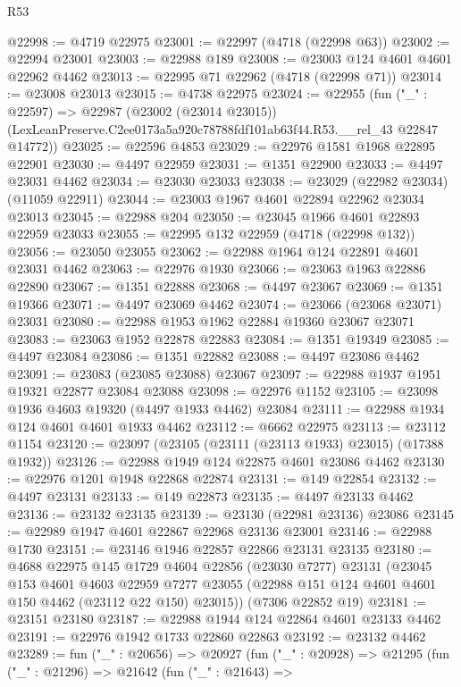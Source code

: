 \begin{lexlean}{R53}
\begin{coremodule}
@22998 := @4719 @22975
@23001 := @22997 (@4718 (@22998 @63))
@23002 := @22994 @23001
@23003 := @22988 @189
@23008 := @23003 @124 @4601 @4601 @22962 @4462
@23013 := @22995 @71 @22962 (@4718 (@22998 @71))
@23014 := @23008 @23013
@23015 := @4738 @22975
@23024 := @22955
    (fun ("_" : @22597) =>
    @22987
      (@23002 (@23014 @23015))
      (LexLeanPreserve.C2ee0173a5a920c78788fdf101ab63f44.R53.__rel_43 @22847 @14772))
@23025 := @22596 @4853
@23029 := @22976 @1581 @1968 @22895 @22901
@23030 := @4497 @22959
@23031 := @1351 @22900
@23033 := @4497 @23031 @4462
@23034 := @23030 @23033
@23038 := @23029 (@22982 @23034) (@11059 @22911)
@23044 := @23003 @1967 @4601 @22894 @22962 @23034 @23013
@23045 := @22988 @204
@23050 := @23045 @1966 @4601 @22893 @22959 @23033
@23055 := @22995 @132 @22959 (@4718 (@22998 @132))
@23056 := @23050 @23055
@23062 := @22988 @1964 @124 @22891 @4601 @23031 @4462
@23063 := @22976 @1930
@23066 := @23063 @1963 @22886 @22890
@23067 := @1351 @22888
@23068 := @4497 @23067
@23069 := @1351 @19366
@23071 := @4497 @23069 @4462
@23074 := @23066 (@23068 @23071) @23031
@23080 := @22988 @1953 @1962 @22884 @19360 @23067 @23071
@23083 := @23063 @1952 @22878 @22883
@23084 := @1351 @19349
@23085 := @4497 @23084
@23086 := @1351 @22882
@23088 := @4497 @23086 @4462
@23091 := @23083 (@23085 @23088) @23067
@23097 := @22988 @1937 @1951 @19321 @22877 @23084 @23088
@23098 := @22976 @1152
@23105 := @23098 @1936 @4603 @19320 (@4497 @1933 @4462) @23084
@23111 := @22988 @1934 @124 @4601 @4601 @1933 @4462
@23112 := @6662 @22975
@23113 := @23112 @1154
@23120 := @23097 (@23105 (@23111 (@23113 @1933) @23015) (@17388 @1932))
@23126 := @22988 @1949 @124 @22875 @4601 @23086 @4462
@23130 := @22976 @1201 @1948 @22868 @22874
@23131 := @149 @22854
@23132 := @4497 @23131
@23133 := @149 @22873
@23135 := @4497 @23133 @4462
@23136 := @23132 @23135
@23139 := @23130 (@22981 @23136) @23086
@23145 := @22989 @1947 @4601 @22867 @22968 @23136 @23001
@23146 := @22988 @1730
@23151 := @23146 @1946 @22857 @22866 @23131 @23135
@23180 := @4688
    @22975
    @145
    @1729
    @4604
    @22856
    (@23030 @7277)
    @23131
    (@23045
      @153
      @4601
      @4603
      @22959
      @7277
      @23055
      (@22988 @151 @124 @4601 @4601 @150 @4462 (@23112 @22 @150) @23015))
    (@7306 @22852 @19)
@23181 := @23151 @23180
@23187 := @22988 @1944 @124 @22864 @4601 @23133 @4462
@23191 := @22976 @1942 @1733 @22860 @22863
@23192 := @23132 @4462
@23289 := fun ("_" : @20656) =>
  @20927
    (fun ("_" : @20928) =>
    @21295
      (fun ("_" : @21296) =>
      @21642
        (fun ("_" : @21643) =>

\end{coremodule}
\end{lexlean}
